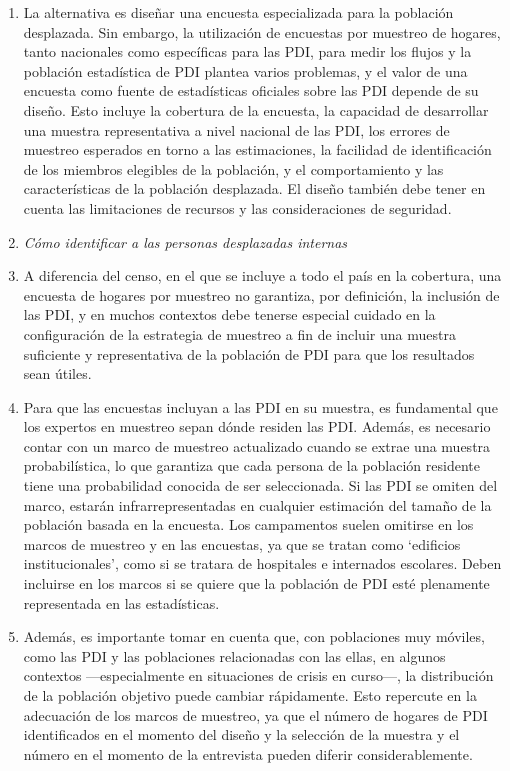 \documentclass[
]{book}
\begin{document}
\begin{enumerate}
\item
  La alternativa es diseñar una encuesta especializada para la población desplazada. Sin embargo, la utilización de encuestas por muestreo de hogares, tanto nacionales como específicas para las PDI, para medir los flujos y la población estadística de PDI plantea varios problemas, y el valor de una encuesta como fuente de estadísticas oficiales sobre las PDI depende de su diseño. Esto incluye la cobertura de la encuesta, la capacidad de desarrollar una muestra representativa a nivel nacional de las PDI, los errores de muestreo esperados en torno a las estimaciones, la facilidad de identificación de los miembros elegibles de la población, y el comportamiento y las características de la población desplazada. El diseño también debe tener en cuenta las limitaciones de recursos y las consideraciones de seguridad.
\item
  \emph{Cómo identificar a las personas desplazadas internas}
\item
  A diferencia del censo, en el que se incluye a todo el país en la cobertura, una encuesta de hogares por muestreo no garantiza, por definición, la inclusión de las PDI, y en muchos contextos debe tenerse especial cuidado en la configuración de la estrategia de muestreo a fin de incluir una muestra suficiente y representativa de la población de PDI para que los resultados sean útiles.
\item
  Para que las encuestas incluyan a las PDI en su muestra, es fundamental que los expertos en muestreo sepan dónde residen las PDI. Además, es necesario contar con un marco de muestreo actualizado cuando se extrae una muestra probabilística, lo que garantiza que cada persona de la población residente tiene una probabilidad conocida de ser seleccionada. Si las PDI se omiten del marco, estarán infrarrepresentadas en cualquier estimación del tamaño de la población basada en la encuesta. Los campamentos suelen omitirse en los marcos de muestreo y en las encuestas, ya que se tratan como `edificios institucionales', como si se tratara de hospitales e internados escolares. Deben incluirse en los marcos si se quiere que la población de PDI esté plenamente representada en las estadísticas.
\item
  Además, es importante tomar en cuenta que, con poblaciones muy móviles, como las PDI y las poblaciones relacionadas con las ellas, en algunos contextos ---especialmente en situaciones de crisis en curso---, la distribución de la población objetivo puede cambiar rápidamente. Esto repercute en la adecuación de los marcos de muestreo, ya que el número de hogares de PDI identificados en el momento del diseño y la selección de la muestra y el número en el momento de la entrevista pueden diferir considerablemente.

\end{enumerate}
\end{document}
